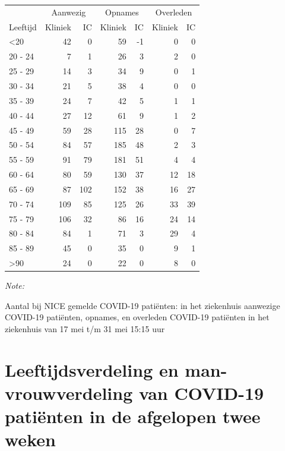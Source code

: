 \documentclass[
  english,
  man,floatsintext]{apa6}
\begin{document}
\begin{table}
\centering\begingroup\fontsize{10}{12}\selectfont

\begin{threeparttable}
\begin{tabular}{lrrrrrr}
\toprule
\multicolumn{1}{c}{ } & \multicolumn{2}{c}{Aanwezig} & \multicolumn{2}{c}{Opnames} & \multicolumn{2}{c}{Overleden} \\
\cmidrule(l{3pt}r{3pt}){2-3} \cmidrule(l{3pt}r{3pt}){4-5} \cmidrule(l{3pt}r{3pt}){6-7}
Leeftijd & Kliniek & IC & Kliniek & IC & Kliniek & IC\\
\midrule
<20 & 42 & 0 & 59 & -1 & 0 & 0\\
20 - 24 & 7 & 1 & 26 & 3 & 2 & 0\\
25 - 29 & 14 & 3 & 34 & 9 & 0 & 1\\
30 - 34 & 21 & 5 & 38 & 4 & 0 & 0\\
35 - 39 & 24 & 7 & 42 & 5 & 1 & 1\\
40 - 44 & 27 & 12 & 61 & 9 & 1 & 2\\
45 - 49 & 59 & 28 & 115 & 28 & 0 & 7\\
50 - 54 & 84 & 57 & 185 & 48 & 2 & 3\\
55 - 59 & 91 & 79 & 181 & 51 & 4 & 4\\
60 - 64 & 80 & 59 & 130 & 37 & 12 & 18\\
65 - 69 & 87 & 102 & 152 & 38 & 16 & 27\\
70 - 74 & 109 & 85 & 125 & 26 & 33 & 39\\
75 - 79 & 106 & 32 & 86 & 16 & 24 & 14\\
80 - 84 & 84 & 1 & 71 & 3 & 29 & 4\\
85 - 89 & 45 & 0 & 35 & 0 & 9 & 1\\
>90 & 24 & 0 & 22 & 0 & 8 & 0\\
\bottomrule
\end{tabular}
\begin{tablenotes}
\item \textit{Note: } 
\item Aantal bij NICE gemelde COVID-19 patiënten: in het ziekenhuis aanwezige COVID-19 patiënten, opnames, en overleden COVID-19 patiënten in het ziekenhuis van 17 mei t/m 31 mei 15:15 uur
\end{tablenotes}
\end{threeparttable}
\endgroup{}
\end{table}

\newpage

\hypertarget{leeftijdsverdeling-en-man-vrouwverdeling-van-covid-19-patiuxebnten-in-de-afgelopen-twee-weken}{%
\section{Leeftijdsverdeling en man-vrouwverdeling van COVID-19 patiënten in de afgelopen twee weken}\label{leeftijdsverdeling-en-man-vrouwverdeling-van-covid-19-patiuxebnten-in-de-afgelopen-twee-weken}}
\end{document}
